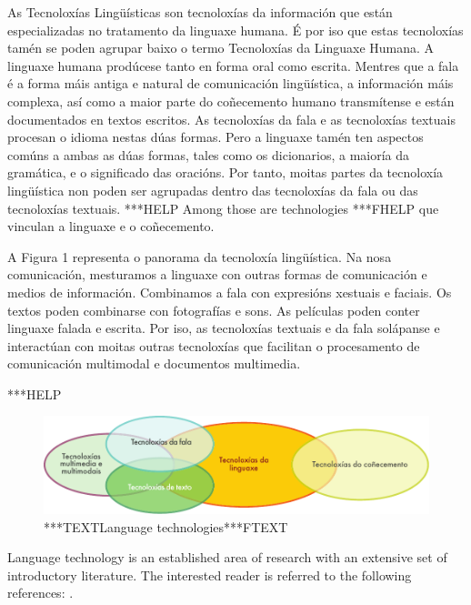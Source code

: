 \begin{multicols}{2}

  As Tecnoloxías Lingüísticas son tecnoloxías da información que están especializadas no tratamento da linguaxe humana. É por iso que estas tecnoloxías tamén se poden agrupar baixo o termo Tecnoloxías da Linguaxe Humana. A linguaxe humana prodúcese tanto en forma oral como escrita. Mentres que a fala é a forma máis antiga e natural de comunicación lingüística, a información máis complexa, así como a maior parte do coñecemento humano transmítense e están documentados en textos escritos. As tecnoloxías da fala e as tecnoloxías textuais procesan o idioma nestas dúas formas. Pero a linguaxe tamén ten aspectos comúns a ambas as dúas formas, tales como os dicionarios, a maioría da gramática, e o significado das oracións. Por tanto, moitas partes da tecnoloxía lingüística non poden ser agrupadas dentro das tecnoloxías da fala ou das tecnoloxías textuais. ***HELP Among those are technologies ***FHELP que vinculan a linguaxe e o coñecemento. 

A Figura 1 representa o panorama da tecnoloxía lingüística. Na nosa comunicación, mesturamos a linguaxe con outras formas de comunicación e medios de información. Combinamos a fala con expresións xestuais e faciais. Os textos poden combinarse con fotografías e sons. As películas poden conter linguaxe falada e escrita. Por iso, as tecnoloxías textuais e da fala solápanse e interactúan con moitas outras tecnoloxías que facilitan o procesamento de comunicación multimodal e documentos multimedia.

***HELP

\begin{figure}[htb]
  \center
  \includegraphics[width=\textwidth]{../_media/galician/language_technologies}
  \caption{***TEXTLanguage technologies***FTEXT}
  \label{fig:ltincontext_ga}
\end{figure}

Language technology is an established area of research with an extensive set of introductory literature. The interested reader is referred to the following references:  \cite{jurafsky-martin01, manning-schuetze1, lt-world1, lt-survey1}.


\end{multicols}
